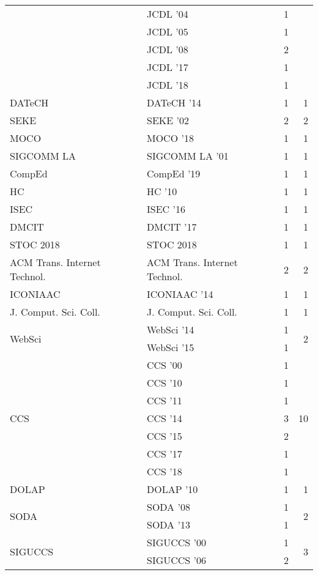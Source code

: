 \begin{table*}[t]
\begin{tabular}{llrr}
& JCDL '04 & 1 &\\
& JCDL '05 & 1 &\\
& JCDL '08 & 2 &\\
& JCDL '17 & 1 &\\
& JCDL '18 & 1 &\\
\multirow{1}{*}{DATeCH } & DATeCH '14 & 1 & \multirow{1}{*}{1}\\
\multirow{1}{*}{SEKE } & SEKE '02 & 2 & \multirow{1}{*}{2}\\
\multirow{1}{*}{MOCO } & MOCO '18 & 1 & \multirow{1}{*}{1}\\
\multirow{1}{*}{SIGCOMM LA } & SIGCOMM LA '01 & 1 & \multirow{1}{*}{1}\\
\multirow{1}{*}{CompEd } & CompEd '19 & 1 & \multirow{1}{*}{1}\\
\multirow{1}{*}{HC } & HC '10 & 1 & \multirow{1}{*}{1}\\
\multirow{1}{*}{ISEC } & ISEC '16 & 1 & \multirow{1}{*}{1}\\
\multirow{1}{*}{DMCIT } & DMCIT '17 & 1 & \multirow{1}{*}{1}\\
\multirow{1}{*}{STOC 2018} & STOC 2018 & 1 & \multirow{1}{*}{1}\\
\multirow{1}{*}{ACM Trans. Internet Technol.} & ACM Trans. Internet Technol. & 2 & \multirow{1}{*}{2}\\
\multirow{1}{*}{ICONIAAC } & ICONIAAC '14 & 1 & \multirow{1}{*}{1}\\
\multirow{1}{*}{J. Comput. Sci. Coll.} & J. Comput. Sci. Coll. & 1 & \multirow{1}{*}{1}\\
\multirow{2}{*}{WebSci } & WebSci '14 & 1 & \multirow{2}{*}{2}\\
& WebSci '15 & 1 &\\
\multirow{7}{*}{CCS } & CCS '00 & 1 & \multirow{7}{*}{10}\\
& CCS '10 & 1 &\\
& CCS '11 & 1 &\\
& CCS '14 & 3 &\\
& CCS '15 & 2 &\\
& CCS '17 & 1 &\\
& CCS '18 & 1 &\\
\multirow{1}{*}{DOLAP } & DOLAP '10 & 1 & \multirow{1}{*}{1}\\
\multirow{2}{*}{SODA } & SODA '08 & 1 & \multirow{2}{*}{2}\\
& SODA '13 & 1 &\\
\multirow{2}{*}{SIGUCCS } & SIGUCCS '00 & 1 & \multirow{2}{*}{3}\\
& SIGUCCS '06 & 2 &\\

\end{tabular}
\end{table*}
